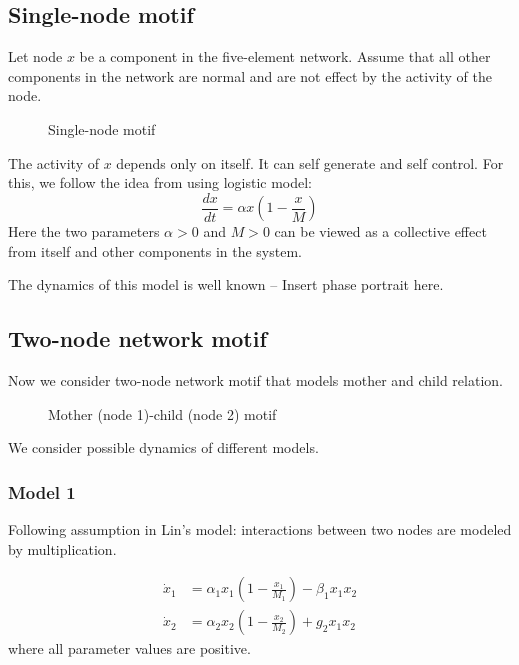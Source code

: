 \documentclass{article}
\begin{document}
\subsection{Single-node motif}
Let node $x$ be a component in the five-element network. 
Assume that all other components in the network are normal and are not effect by the activity of the node. 
\begin{figure}[!htb]
\centering
{}
 \label{F:single_node}
 \caption{Single-node motif}
\end{figure}
The activity of $x$ depends only on itself. It can self generate and self control. For this, we follow the idea from \cite{Nian2025} using logistic model:
\[
\frac{dx}{dt} = \alpha x(1-\frac{x}{M})
\]
Here the two parameters $\alpha>0$ and $M>0$ can be viewed as a collective effect from itself and other components in the system.

The dynamics of this model is well known -- Insert phase portrait here.

\subsection{Two-node network motif}
Now we consider two-node network motif that models mother and child relation.
\begin{figure}[!htb]
\centering
{}
 \caption{Mother (node 1)-child (node 2) motif}
 \label{F:Mother-Child}
\end{figure}
We consider possible dynamics of different models. 

\subsubsection{ Model 1}
Following assumption in Lin's model: interactions between two nodes are modeled by multiplication.

\begin{equation}\label{E:Lin_2_node_Model}
\begin{array}{rl}
    \dot x_1  & = \alpha_1 x_1(1-\frac{x_1}{M_1}) - \beta_1 x_1 x_2   \\
     \dot x_2 &= \alpha_2 x_2 (1-\frac{x_2}{M_2}) + g_2 x_1x_2
\end{array}
\end{equation}
where all parameter values are positive.
\end{document}
